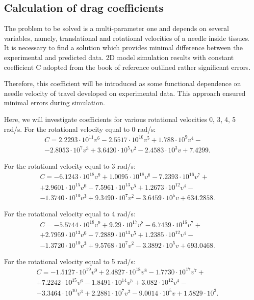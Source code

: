 \documentclass[a4paper]{jpconf}
\begin{document}
\subsection{Calculation of drag coefficients}
The problem to be solved is a multi-parameter one and depends on several variables, namely, translational and rotational velocities of a needle inside tissues. It is necessary to find a solution which provides minimal difference between the experimental and predicted data. 2D model simulation results with constant coefficient C adopted from the book of reference outlined rather significant errors.

Therefore, this coefficient will be introduced as some functional dependence on needle velocity of travel developed on experimental data. This approach ensured minimal errors during simulation. 

Here, we will investigate coefficients for various rotational velocities 0, 3, 4, 5 rad/s.
For the rotational velocity equal to 0 rad/s:
\begin{multline} \label{eq12}
C= 2.2293\cdot10^{11} v^6 - 2.5517\cdot10^{10} v^5+1.788\cdot10^9 v^4 - \\ -2.8053\cdot10^7 v^3 +3.6420\cdot10^5 v^2-2.4583\cdot10^3 v+7.4299.
\end{multline}

For the rotational velocity equal to 3 rad/s:
\begin{multline} \label{eq13}
C= -6.1243\cdot10^{18} v^9 + 1.0095\cdot10^{18}v^8 -  7.2393\cdot10^{16} v^7 +\\+ 2.9601\cdot10^{15} v^6 - 7.5961\cdot10^{13} v^5 + 1.2673\cdot10^{12} v^4 - \\-1.3740\cdot10^{10} v^3 + 9.3490\cdot10^7 v^2 - 3.6459\cdot10^5 v+ 634.2858.
\end{multline}

For the rotational velocity equal to 4 rad/s:
\begin{multline} \label{eq14}
C= -5.5744\cdot10^{18} v^9 + 9.29\cdot10^{17}v^8 -  6.7439\cdot10^{16} v^7 +\\+ 2.7959\cdot10^{13} v^6 - 7.2889\cdot10^{13} v^5 + 1.2385\cdot10^{12} v^4 - \\-1.3720\cdot10^{10} v^3 + 9.5768\cdot10^7 v^2 - 3.3892\cdot10^5 v+ 693.0468.
\end{multline}

For the rotational velocity equal to 5 rad/s:
\begin{multline} \label{eq15}
C= -1.5127\cdot10^{19} v^9 + 2.4827\cdot10^{18}v^8 -  1.7730\cdot10^{17} v^7 +\\+ 7.2242\cdot10^{15} v^6 - 1.8491\cdot10^{14} v^5 + 3.082\cdot10^{12} v^4 - \\-3.3464\cdot10^{10} v^3 + 2.2881\cdot10^7 v^2 - 9.0014\cdot10^5 v+ 1.5829\cdot10^3.
\end{multline}
\end{document}
